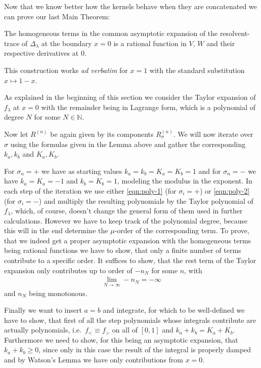 Now that we know better how the kernels behave when they are concatenated we can
prove our last Main Theorem:
\begin{MainTheorem}
  The homogeneous terms in the  common asymptotic expansion of the
  resolvent-trace of $\Delta_\lambda$ at the boundary $x = 0$ is a rational
  function in $V$, $W$ and their respective derivatives at $0$.
  \begin{Remark}
    This construction works \emph{ad verbatim} for $x=1$ with the standard
    substitution $x\mapsto 1 - x$.
  \end{Remark}
  \begin{Proof}
    As explained in the beginning of this section we consider the Taylor
    expansion of $f_\lambda$ at $x=0$ with the remainder being in Lagrange form,
    which is a polynomial of degree $N$ for some $N\in\mathbb{N}$.

    Now let $R^{(n)}$ be again given by its components $R^{(n)}_{\sigma}$. We
    will now iterate over $\sigma$ using the formulas given in the Lemma above
    and gather the corresponding $k_a,k_b$ and $K_a,K_b$.

    For $\sigma_{n} = +$ we have as starting values $k_a = k_b = K_a = K_b = 1$
    and for $\sigma_{n} = -$ we have $k_a = K_a = -1$ and $k_b = K_b = 1$,
    modeling the modulus in the exponent. In each step of the iteration we use
    either \eqref{eqn:poly-1} (for $\sigma_i = +$) or \eqref{eqn:poly-2} (for
    $\sigma_i = -$) and multiply the resulting polynomials by the
    Taylor polynomial of $f_{\lambda}$, which, of course, doesn't change the
    general form of them used in further calculations. However we have to keep
    track of the polynomial degree, because this will in the end determine the
    $\mu$-order of the corresponding term. To prove, that we indeed get a proper
    asymptotic expansion with the homogeneous terms being rational functions we
    have to show, that only a finite number of terms contribute to a specific
    order. It suffices to show, that the rest term of the Taylor expansion only
    contributes up to order of $-n_N$ for some $n$, with
    \begin{align*}
      \lim_{N\to\infty} -n_N = -\infty
    \end{align*}
    and $n_N$ being monotonous.

    Finally we want to insert $a = b$ and integrate, for which to be
    well-defined we have to show, that first of all the step polynomials whose
    integrals contribute are actually polynomials, i.e.\ $f_< \equiv f_>$ on all
    of $[0,1]$ and $k_a + k_b = K_a + K_b$. Furthermore we need to show, for
    this being an asymptotic expansion, that $k_a + k_b \geq 0$, since only in
    this case the result of the integral is properly damped and by Watson's
    Lemma we have only contributions from $x = 0$.


\end{Proof}
\end{MainTheorem}
